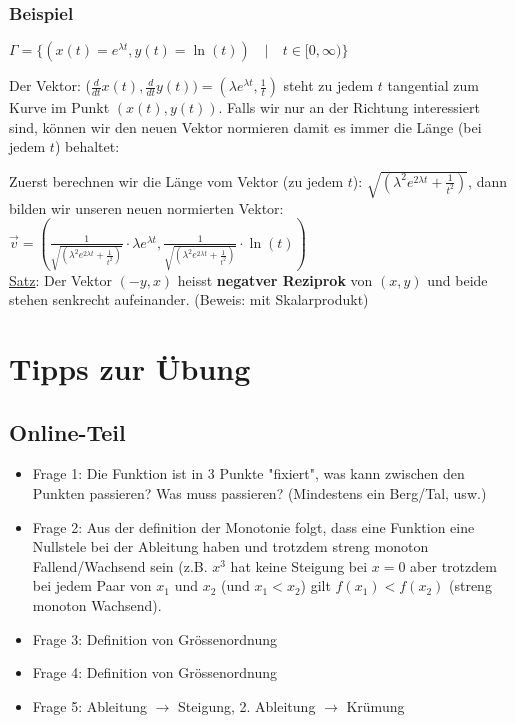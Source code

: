 \documentclass[11pt]{article} %
\begin{document}
\subsubsection{Beispiel}
$\Gamma = \{(x(t) = e^{\lambda t}, y(t) = \ln(t)) \quad | \quad t \in [0,\infty) \}$

Der Vektor: ($\frac{d}{dt}x(t), \frac{d}{dt}y(t)) = (\lambda e^{\lambda t}, \frac{1}{t})$ steht zu jedem $t$ tangential zum Kurve im Punkt $(x(t), y(t))$. Falls wir nur an der Richtung interessiert sind, können wir den neuen Vektor normieren damit es immer die Länge (bei jedem $t$) behaltet:

Zuerst berechnen wir die Länge vom Vektor (zu jedem $t$): $\sqrt{(\lambda^2 e^{2\lambda t}+ \frac{1}{t^2})}$, dann bilden wir unseren neuen normierten Vektor:\\ 
$\vec v= (\frac{1}{\sqrt{(\lambda^2 e^{2\lambda t}+ \frac{1}{t^2})}}\cdot\lambda e^{\lambda t}, \frac{1}{\sqrt{(\lambda^2 e^{2\lambda t}+ \frac{1}{t^2})}} \cdot \ln(t))$\\


\underline{Satz}: Der Vektor $(-y,x)$ heisst {\bf negatver Reziprok} von $(x,y)$ und beide stehen senkrecht aufeinander. (Beweis: mit Skalarprodukt) 


\section{Tipps zur Übung}

\subsection{Online-Teil}
\begin{itemize}
\item Frage 1: Die Funktion ist in 3 Punkte "fixiert", was kann zwischen den Punkten passieren? Was muss passieren? (Mindestens ein Berg/Tal, usw.)
\item Frage 2: Aus der definition der Monotonie folgt, dass eine Funktion eine Nullstele bei der Ableitung haben und trotzdem streng monoton Fallend/Wachsend sein (z.B. $x^3$ hat keine Steigung bei $x=0$ aber trotzdem bei jedem Paar von $x_1$ und $x_2$ (und $x_1 < x_2$) gilt $f(x_1)< f(x_2)$ (streng monoton Wachsend).
\item Frage 3: Definition von Grössenordnung
\item Frage 4: Definition von Grössenordnung
\item Frage 5: Ableitung $\rightarrow$ Steigung, 2. Ableitung $\rightarrow$ Krümung 
\end{itemize}
\end{document}
